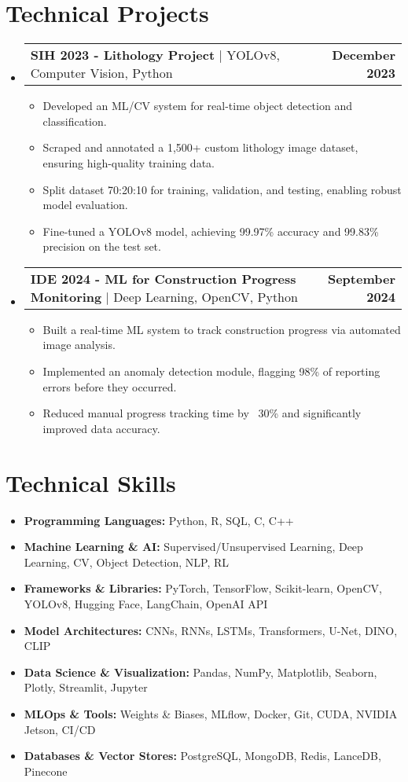 \documentclass[letterpaper,11pt]{article}
\makeatletter
\newcommand{\resumeItem}[1]{
  \item\small{
    {#1 \vspace{-2pt}}
  }
}
\newcommand{\resumeProjectHeading}[2]{
  \item
  \begin{tabular*}{1.0\textwidth}{l@{\extracolsep{\fill}}r}
    \small#1 & \textbf{\small #2}\\
  \end{tabular*}\vspace{-7pt}
}
\newcommand{\resumeSubHeadingListStart}{\begin{itemize}[leftmargin=0.0in, label={}]}
\newcommand{\resumeSubHeadingListEnd}{\end{itemize}}
\newcommand{\resumeItemListStart}{\begin{itemize}}
\newcommand{\resumeItemListEnd}{\end{itemize}\vspace{-5pt}}
\makeatother
\begin{document}
\section{Technical Projects}
\resumeSubHeadingListStart
  \resumeProjectHeading
    {\textbf{SIH 2023 - Lithology Project} $|$ YOLOv8, Computer Vision, Python}{December 2023}
    \resumeItemListStart
      \resumeItem{Developed an ML/CV system for real-time object detection and classification.}
      \resumeItem{Scraped and annotated a 1,500+ custom lithology image dataset, ensuring high-quality training data.}
      \resumeItem{Split dataset 70:20:10 for training, validation, and testing, enabling robust model evaluation.}
      \resumeItem{Fine-tuned a YOLOv8 model, achieving 99.97\% accuracy and 99.83\% precision on the test set.}
    \resumeItemListEnd

  \resumeProjectHeading
    {\textbf{IDE 2024 - ML for Construction Progress Monitoring} $|$ Deep Learning, OpenCV, Python}{September 2024}
    \resumeItemListStart
      \resumeItem{Built a real-time ML system to track construction progress via automated image analysis.}
      \resumeItem{Implemented an anomaly detection module, flagging 98\% of reporting errors before they occurred.}
      \resumeItem{Reduced manual progress tracking time by ~30\% and significantly improved data accuracy.}
    \resumeItemListEnd


    
\resumeSubHeadingListEnd

\section{Technical Skills}
\resumeSubHeadingListStart
  \resumeItem{\textbf{Programming Languages:} Python, R, SQL, C, C++}
  \resumeItem{\textbf{Machine Learning \& AI:} Supervised/Unsupervised Learning, Deep Learning, CV, Object Detection, NLP, RL}
  \resumeItem{\textbf{Frameworks \& Libraries:} PyTorch, TensorFlow, Scikit-learn, OpenCV, YOLOv8, Hugging Face, LangChain, OpenAI API}
  \resumeItem{\textbf{Model Architectures:} CNNs, RNNs, LSTMs, Transformers, U-Net, DINO, CLIP}
  \resumeItem{\textbf{Data Science \& Visualization:} Pandas, NumPy, Matplotlib, Seaborn, Plotly, Streamlit, Jupyter}
  \resumeItem{\textbf{MLOps \& Tools:} Weights \& Biases, MLflow, Docker, Git, CUDA, NVIDIA Jetson, CI/CD}
  \resumeItem{\textbf{Databases \& Vector Stores:} PostgreSQL, MongoDB, Redis, LanceDB, Pinecone}
\resumeSubHeadingListEnd
\end{document}
